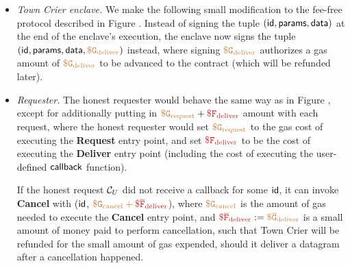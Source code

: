 \begin{itemize}[leftmargin=5mm]
\item
{\it Town Crier enclave.}
We make the following small modification to the fee-free protocol
described in Figure .
Instead of signing the tuple $({\sf id}, {\sf params}, {\sf data})$
at the end of the enclave's execution, the enclave now signs 
the tuple $({\sf id}, {\sf params}, {\sf data}, 
\tt {\color{brown} \$ G_{\text{deliver}} })$
instead, where signing 
$\tt {\color{brown} \$ G_{\text{deliver}} }$ authorizes a
gas amount of $\tt {\color{brown} \$ G_{\text{deliver}} }$ to be advanced
to the contract (which will be refunded later).
\item
{\it Requester.}
The honest requester would behave the same way as in Figure ,
except for additionally putting 
in $\sbrown{\$ G_{\text{request}}} + \smaroon{\$ F_{\text{deliver}}}$ 
amount with each request, 
where the honest 
requester would set  
$\tt {\color{brown} \$ G_{\text{request}} }$
to the gas cost of executing the  
{\bf Request} entry point,
and set $\smaroon{\$ F_{\text{deliver}}}$ to be the cost 
of executing the {\bf Deliver} entry point (including
the cost of executing the user-defined ${\sf callback}$ function).

If the honest request ${\cal C}_U$ did not receive
a callback for some ${\sf id}$,  
it can invoke {\bf Cancel}
with (${\sf id}$, $\sbrown{\$ G_{\text{cancel}} + \smaroon{\$ \overline{F}_{\text{deliver}}}}$),
where $\tt {\color{brown} \$ G_{\text{cancel}} }$ is the amount of gas needed 
to execute the {\bf Cancel} entry point, and $\smaroon{\$ \overline{F}_{\text{deliver}}} := \sbrown{\$ \overline{G}_{\text{deliver}}}$
is a small amount of money paid to perform cancellation, 
such that Town Crier will be refunded for the small amount of gas expended,
should it deliver a datagram after a cancellation happened.
\end{itemize}


